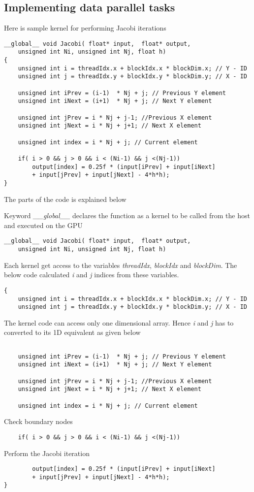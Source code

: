 \documentclass[a4paper]{report}
\begin{document}
	\subsection{Implementing data parallel tasks}
	Here is sample kernel for performing Jacobi iterations
	\begin{lstlisting}
__global__ void Jacobi( float* input,  float* output, 
	unsigned int Ni, unsigned int Nj, float h)
{
	unsigned int i = threadIdx.x + blockIdx.x * blockDim.x; // Y - ID
	unsigned int j = threadIdx.y + blockIdx.y * blockDim.y; // X - ID

	unsigned int iPrev = (i-1)  * Nj + j; // Previous Y element
	unsigned int iNext = (i+1)  * Nj + j; // Next Y element

	unsigned int jPrev = i * Nj + j-1; //Previous X element
	unsigned int jNext = i * Nj + j+1; // Next X element
	
	unsigned int index = i * Nj + j; // Current element

	if( i > 0 && j > 0 && i < (Ni-1) && j <(Nj-1))
		output[index] = 0.25f * (input[iPrev] + input[iNext] 
		+ input[jPrev] + input[jNext] - 4*h*h);
}
	\end{lstlisting}
	The parts of the code is explained below
	
	Keyword \emph{\_\_global\_\_} declares the function as a kernel to be called from the host and executed on the GPU
	\begin{lstlisting}
__global__ void Jacobi( float* input,  float* output, 
	unsigned int Ni, unsigned int Nj, float h)
	\end{lstlisting}
	Each kernel get access to the variables \emph{threadIdx}, \emph{blockIdx} and \emph{blockDim}. The below code calculated \textit{i} and \textit{j} indices from these variables.
	\begin{lstlisting}
{
	unsigned int i = threadIdx.x + blockIdx.x * blockDim.x; // Y - ID
	unsigned int j = threadIdx.y + blockIdx.y * blockDim.y; // X - ID
	\end{lstlisting}
	The kernel code can access only one dimensional array. Hence \textit{i} and \textit{j} has to converted to its 1D equivalent as given below
	\begin{lstlisting}

	unsigned int iPrev = (i-1)  * Nj + j; // Previous Y element
	unsigned int iNext = (i+1)  * Nj + j; // Next Y element

	unsigned int jPrev = i * Nj + j-1; //Previous X element
	unsigned int jNext = i * Nj + j+1; // Next X element

	unsigned int index = i * Nj + j; // Current element
	\end{lstlisting}
	Check boundary  nodes
	\begin{lstlisting}
	if( i > 0 && j > 0 && i < (Ni-1) && j <(Nj-1))
	\end{lstlisting}
	Perform the Jacobi iteration
	\begin{lstlisting}
		output[index] = 0.25f * (input[iPrev] + input[iNext] 
		+ input[jPrev] + input[jNext] - 4*h*h);
}
	\end{lstlisting}
	
\end{document}
